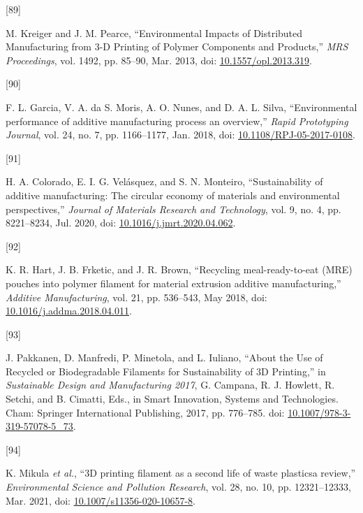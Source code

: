 \documentclass[
]{article}
\newlength{\cslhangindent}
\newlength{\csllabelwidth}
\newlength{\cslentryspacingunit} %
\newenvironment{CSLReferences}[2] %
 {%
  \setlength{\parindent}{0pt}
  \ifodd #1
  \let\oldpar\par
  \def\par{\hangindent=\cslhangindent\oldpar}
  \fi
  \setlength{\parskip}{#2\cslentryspacingunit}
 }%
 {}
\newcommand{\CSLLeftMargin}[1]{\parbox[t]{\csllabelwidth}{#1}}
\newcommand{\CSLRightInline}[1]{\parbox[t]{\linewidth - \csllabelwidth}{#1}\break}
\begin{document}
\begin{CSLReferences}{0}{0}
\leavevmode{}%
\CSLLeftMargin{{[}89{]} }%
\CSLRightInline{M. Kreiger and J. M. Pearce, {``Environmental {Impacts}
of {Distributed Manufacturing} from 3-{D Printing} of {Polymer
Components} and {Products},''} \emph{MRS Proceedings}, vol. 1492, pp.
85--90, Mar. 2013, doi:
\href{https://doi.org/10.1557/opl.2013.319}{10.1557/opl.2013.319}.}

\leavevmode{}%
\CSLLeftMargin{{[}90{]} }%
\CSLRightInline{F. L. Garcia, V. A. da S. Moris, A. O. Nunes, and D. A.
L. Silva, {``Environmental performance of additive manufacturing process
\textendash{} an overview,''} \emph{Rapid Prototyping Journal}, vol. 24,
no. 7, pp. 1166--1177, Jan. 2018, doi:
\href{https://doi.org/10.1108/RPJ-05-2017-0108}{10.1108/RPJ-05-2017-0108}.}

\leavevmode{}%
\CSLLeftMargin{{[}91{]} }%
\CSLRightInline{H. A. Colorado, E. I. G. Velásquez, and S. N. Monteiro,
{``Sustainability of additive manufacturing: The circular economy of
materials and environmental perspectives,''} \emph{Journal of Materials
Research and Technology}, vol. 9, no. 4, pp. 8221--8234, Jul. 2020, doi:
\href{https://doi.org/10.1016/j.jmrt.2020.04.062}{10.1016/j.jmrt.2020.04.062}.}

\leavevmode{}%
\CSLLeftMargin{{[}92{]} }%
\CSLRightInline{K. R. Hart, J. B. Frketic, and J. R. Brown, {``Recycling
meal-ready-to-eat ({MRE}) pouches into polymer filament for material
extrusion additive manufacturing,''} \emph{Additive Manufacturing}, vol.
21, pp. 536--543, May 2018, doi:
\href{https://doi.org/10.1016/j.addma.2018.04.011}{10.1016/j.addma.2018.04.011}.}

\leavevmode{}%
\CSLLeftMargin{{[}93{]} }%
\CSLRightInline{J. Pakkanen, D. Manfredi, P. Minetola, and L. Iuliano,
{``About the {Use} of {Recycled} or {Biodegradable Filaments} for
{Sustainability} of {3D Printing},''} in \emph{Sustainable {Design} and
{Manufacturing} 2017}, G. Campana, R. J. Howlett, R. Setchi, and B.
Cimatti, Eds., in Smart {Innovation}, {Systems} and {Technologies}.
{Cham}: {Springer International Publishing}, 2017, pp. 776--785. doi:
\href{https://doi.org/10.1007/978-3-319-57078-5_73}{10.1007/978-3-319-57078-5\_73}.}

\leavevmode{}%
\CSLLeftMargin{{[}94{]} }%
\CSLRightInline{K. Mikula \emph{et al.}, {``{3D} printing filament as a
second life of waste plastics\textemdash a review,''}
\emph{Environmental Science and Pollution Research}, vol. 28, no. 10,
pp. 12321--12333, Mar. 2021, doi:
\href{https://doi.org/10.1007/s11356-020-10657-8}{10.1007/s11356-020-10657-8}.}


\end{CSLReferences}
\end{document}

